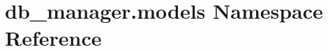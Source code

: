 \hypertarget{namespacedb__manager_1_1models}{\section{db\-\_\-manager.\-models Namespace Reference}
\label{namespacedb__manager_1_1models}
}
